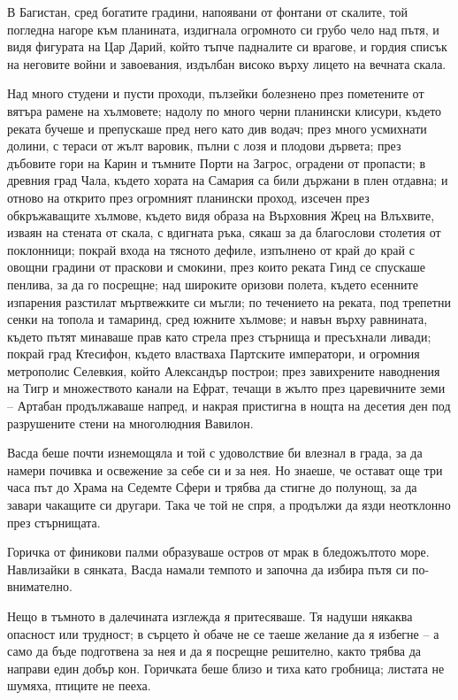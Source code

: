 \documentclass[oneside,10pt]{memoir}
\begin{document}
В Багистан, сред богатите градини, напоявани от фонтани от скалите, той погледна
нагоре към планината, издигнала огромното си грубо чело над пътя, и видя
фигурата на Цар Дарий, който тъпче падналите си врагове, и гордия списък на
неговите войни и завоевания, издълбан високо върху лицето на вечната скала.

Над много студени и пусти проходи, пълзейки болезнено през пометените от вятъра
рамене на хълмовете; надолу по много черни планински клисури, където реката
бучеше и препускаше пред него като див водач; през много усмихнати долини, с
тераси от жълт варовик, пълни с лозя и плодови дървета; през дъбовите гори на
Карин и тъмните Порти на Загрос, оградени от пропасти; в древния град Чала,
където хората на Самария са били държани в плен отдавна; и отново на открито
през огромният планински проход, изсечен през обкръжаващите хълмове, където видя
образа на Върховния Жрец на Влъхвите, изваян на стената от скала, с вдигната
ръка, сякаш за да благослови столетия от поклонници; покрай входа на тясното
дефиле, изпълнено от край до край с овощни градини от праскови и смокини, през
които реката Гинд се спускаше пенлива, за да го посрещне; над широките оризови
полета, където есенните изпарения разстилат мъртвежките си мъгли; по течението
на реката, под трепетни сенки на топола и тамаринд, сред южните хълмове; и навън
върху равнината, където пътят минаваше прав като стрела през стърнища и
пресъхнали ливади; покрай град Ктесифон, където властваха Партските императори,
и огромния метрополис Селевкия, който Александър построи; през завихрените
наводнения на Тигр и множеството канали на Ефрат, течащи в жълто през
царевичните земи -- Артабан продължаваше напред, и накрая пристигна в нощта на
десетия ден под разрушените стени на многолюдния Вавилон.

Васда беше почти изнемощяла и той с удоволствие би влезнал в града, за да намери
почивка и освежение за себе си и за нея. Но знаеше, че остават още три часа път
до Храма на Седемте Сфери и трябва да стигне до полунощ, за да завари чакащите
си другари. Така че той не спря, а продължи да язди неотклонно през
стърнищата.

Горичка от финикови палми образуваше остров от мрак в бледожълтото море.
Навлизайки в сянката, Васда намали темпото и започна да избира пътя си
по-внимателно.

Нещо в тъмното в далечината изглежда я притесяваше. Тя надуши някаква опасност
или трудност; в сърцето ѝ обаче не се таеше желание да я избегне -- а само да
бъде подготвена за нея и да я посрещне решително, както трябва да направи един
добър кон. Горичката беше близо и тиха като гробница; листата не шумяха, птиците
не пееха.
\end{document}
